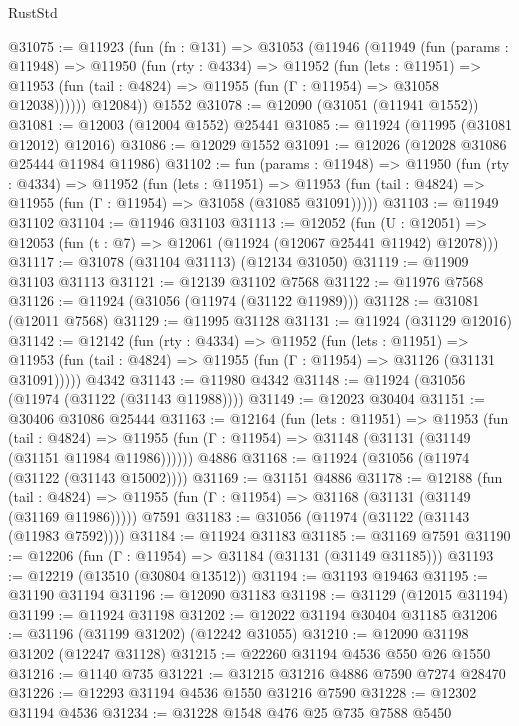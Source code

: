 \begin{lexlean}{RustStd}
\begin{coremodule}
{\begin{coremodule}
{{{{{{{{{{{{{{{{{{{{{{{{{{{{{{{{{{{{{{{{{{{{{{{{{{{{{{{{{{{{{{{{{{{{{{{{{{{{{{{{@31075 := @11923
    (fun (fn : @131) =>
    @31053
      (@11946
        (@11949
          (fun (params : @11948) =>
          @11950
            (fun (rty : @4334) =>
            @11952
              (fun (lets : @11951) =>
              @11953 (fun (tail : @4824) => @11955 (fun (Γ : @11954) => @31058 @12038))))))
        @12084))
    @1552
@31078 := @12090 (@31051 (@11941 @1552))
@31081 := @12003 (@12004 @1552) @25441
@31085 := @11924 (@11995 (@31081 @12012) @12016)
@31086 := @12029 @1552
@31091 := @12026 (@12028 @31086 @25444 @11984 @11986)
@31102 := fun (params : @11948) =>
  @11950
    (fun (rty : @4334) =>
    @11952
      (fun (lets : @11951) =>
      @11953 (fun (tail : @4824) => @11955 (fun (Γ : @11954) => @31058 (@31085 @31091)))))
@31103 := @11949 @31102
@31104 := @11946 @31103
@31113 := @12052
    (fun (U : @12051) => @12053 (fun (t : @7) => @12061 (@11924 (@12067 @25441 @11942) @12078)))
@31117 := @31078 (@31104 @31113) (@12134 @31050)
@31119 := @11909 @31103 @31113
@31121 := @12139 @31102 @7568
@31122 := @11976 @7568
@31126 := @11924 (@31056 (@11974 (@31122 @11989)))
@31128 := @31081 (@12011 @7568)
@31129 := @11995 @31128
@31131 := @11924 (@31129 @12016)
@31142 := @12142
    (fun (rty : @4334) =>
    @11952
      (fun (lets : @11951) =>
      @11953 (fun (tail : @4824) => @11955 (fun (Γ : @11954) => @31126 (@31131 @31091)))))
    @4342
@31143 := @11980 @4342
@31148 := @11924 (@31056 (@11974 (@31122 (@31143 @11988))))
@31149 := @12023 @30404
@31151 := @30406 @31086 @25444
@31163 := @12164
    (fun (lets : @11951) =>
    @11953
      (fun (tail : @4824) =>
      @11955 (fun (Γ : @11954) => @31148 (@31131 (@31149 (@31151 @11984 @11986))))))
    @4886
@31168 := @11924 (@31056 (@11974 (@31122 (@31143 @15002))))
@31169 := @31151 @4886
@31178 := @12188
    (fun (tail : @4824) => @11955 (fun (Γ : @11954) => @31168 (@31131 (@31149 (@31169 @11986)))))
    @7591
@31183 := @31056 (@11974 (@31122 (@31143 (@11983 @7592))))
@31184 := @11924 @31183
@31185 := @31169 @7591
@31190 := @12206 (fun (Γ : @11954) => @31184 (@31131 (@31149 @31185)))
@31193 := @12219 (@13510 (@30804 @13512))
@31194 := @31193 @19463
@31195 := @31190 @31194
@31196 := @12090 @31183
@31198 := @31129 (@12015 @31194)
@31199 := @11924 @31198
@31202 := @12022 @31194 @30404 @31185
@31206 := @31196 (@31199 @31202) (@12242 @31055)
@31210 := @12090 @31198 @31202 (@12247 @31128)
@31215 := @22260 @31194 @4536 @550 @26 @1550
@31216 := @1140 @735
@31221 := @31215 @31216 @4886 @7590 @7274 @28470
@31226 := @12293 @31194 @4536 @1550 @31216 @7590
@31228 := @12302 @31194 @4536
@31234 := @31228 @1548 @476 @25 @735 @7588 @5450
}}}}}}}}}}}}}}}}}}}}}}}}}}}}}}}}}}}}}}}}}}}}}}}}}}}}}}}}}}}}}}}}}}}}}}}}}}}}}}}}
\end{coremodule}}
\end{coremodule}
\end{lexlean}
